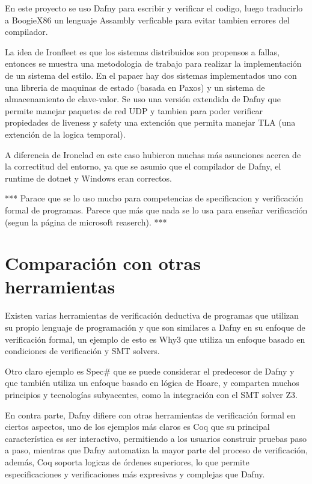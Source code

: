\documentclass[runningheads]{llncs}
\begin{document}
En este proyecto se uso Dafny para escribir y verificar el codigo, luego traducirlo a BoogieX86 un lenguaje Assambly verficable para evitar tambien errores del compilador.

La idea de Ironfleet\cite{hawblitzel2015ironfleet} es que los sistemas distribuidos son propensos a fallas, entonces se muestra una metodologia de trabajo para realizar la implementación de un sistema del estilo. En el papaer hay dos sistemas implementados uno con una libreria de maquinas de estado (basada en Paxos) y un sistema de almacenamiento de clave-valor.
Se uso una versión extendida de Dafny que permite manejar paquetes de red UDP y tambien para poder verificar propiedades de liveness y safety una extención que permita manejar TLA (una extención de la logica temporal).

A diferencia de Ironclad en este caso hubieron muchas más asunciones acerca de la correctitud del entorno, ya que se asumio que el compilador de Dafny, el runtime de dotnet y Windows eran correctos.

***
Parace que se lo uso mucho para competencias de specificacion y verificación formal de programas.
Parece que más que nada se lo usa para enseñar verificación (segun la página de microsoft reaserch).
***
\section{Comparación con otras herramientas}

Existen varias herramientas de verificación deductiva de programas que utilizan su propio lenguaje de programación 
y que son similares a Dafny en su enfoque de verificación formal, 
un ejemplo de esto es Why3 que utiliza un enfoque basado en condiciones de verificación y SMT solvers.

Otro claro ejemplo es Spec\# que se puede considerar el predecesor de Dafny y que también utiliza un enfoque basado en lógica de Hoare,
y comparten muchos principios y tecnologías subyacentes, como la integración con el SMT solver Z3.

En contra parte, Dafny difiere con otras herramientas de verificación formal en ciertos aspectos, uno de los ejemplos más claros es Coq 
que su principal característica es ser interactivo, 
permitiendo a los usuarios construir pruebas paso a paso, mientras que Dafny automatiza la mayor parte del proceso de verificación,
además, Coq soporta logicas de órdenes superiores, lo que permite especificaciones y verificaciones más expresivas y complejas que Dafny.
\end{document}

